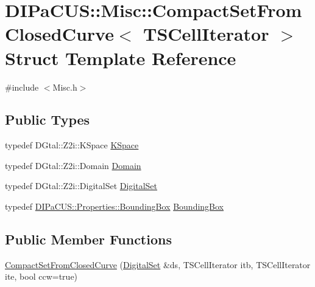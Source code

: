 \hypertarget{structDIPaCUS_1_1Misc_1_1CompactSetFromClosedCurve}{}\section{D\+I\+Pa\+C\+US\+:\+:Misc\+:\+:Compact\+Set\+From\+Closed\+Curve$<$ T\+S\+Cell\+Iterator $>$ Struct Template Reference}
\label{structDIPaCUS_1_1Misc_1_1CompactSetFromClosedCurve}


{\ttfamily \#include $<$Misc.\+h$>$}

\subsection*{Public Types}
\begin{DoxyCompactItemize}
\item 
typedef D\+Gtal\+::\+Z2i\+::\+K\+Space \hyperlink{structDIPaCUS_1_1Misc_1_1CompactSetFromClosedCurve_ae0abf12acccdd86815be164230d55500}{K\+Space}
\item 
typedef D\+Gtal\+::\+Z2i\+::\+Domain \hyperlink{structDIPaCUS_1_1Misc_1_1CompactSetFromClosedCurve_ae2c31e3a7c2fe1d68612d5255eac221b}{Domain}
\item 
typedef D\+Gtal\+::\+Z2i\+::\+Digital\+Set \hyperlink{structDIPaCUS_1_1Misc_1_1CompactSetFromClosedCurve_a47e3100b4196961a629785d14f6ad645}{Digital\+Set}
\item 
typedef \hyperlink{structDIPaCUS_1_1Properties_1_1BoundingBox}{D\+I\+Pa\+C\+U\+S\+::\+Properties\+::\+Bounding\+Box} \hyperlink{structDIPaCUS_1_1Misc_1_1CompactSetFromClosedCurve_ac4c5ff73741ac1fb3dac591a1a2ad0d9}{Bounding\+Box}
\end{DoxyCompactItemize}
\subsection*{Public Member Functions}
\begin{DoxyCompactItemize}
\item 
\hyperlink{structDIPaCUS_1_1Misc_1_1CompactSetFromClosedCurve_a1658703bdaf299c6a876b45f937cab5d}{Compact\+Set\+From\+Closed\+Curve} (\hyperlink{structDIPaCUS_1_1Misc_1_1CompactSetFromClosedCurve_a47e3100b4196961a629785d14f6ad645}{Digital\+Set} \&ds, T\+S\+Cell\+Iterator itb, T\+S\+Cell\+Iterator ite, bool ccw=true)
\end{DoxyCompactItemize}


